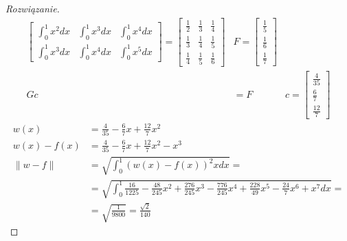 \documentclass{article}
\begin{document}
\begin{enumerate}
\begin{proof}[Rozwiązanie]
\begin{align*}
\begin{bmatrix}
		\int_{0}^{1}x^2dx & \int_{0}^{1}x^3dx & \int_{0}^{1}x^4dx \\
		\int_{0}^{1}x^3dx & \int_{0}^{1}x^4dx & \int_{0}^{1}x^5dx 
		\end{bmatrix} =
		\begin{bmatrix}
			\frac12&\frac13&\frac14\\
			\frac13&\frac14&\frac15\\
			\frac14&\frac15&\frac16
		\end{bmatrix} &
		F=	\begin{bmatrix}
			\frac15\\ \frac16\\ \frac17
		\end{bmatrix}\\
		Gc&=F & c =
		\begin{bmatrix}
			\frac4{35}\\
			\frac67\\
			\frac{12}7
		\end{bmatrix}
	\end{align*}
	\begin{align*}
		w(x)&=\frac4{35}- \frac67x + \frac{12}7x^2 \\
		w(x) - f(x) &= \frac4{35}- \frac67x + \frac{12}7x^2 - x^3\\
		\|w-f\|&=\sqrt{\int_{0}^{1}(w(x)-f(x))^2xdx}=\\
		&=  \sqrt{\int_{0}^{1}\frac{16}{1225} - \frac{48}{245}x^2 + \frac{276}{245}x^3 - \frac{776}{245}x^4 + \frac{228}{49}x^5 - \frac{24}{7}x^6 + x^7dx}=\\
		&=\sqrt{\frac1{9800}}=\frac{\sqrt2}{140}
	\end{align*}
	
\end{proof}
\end{enumerate}
\end{document}
